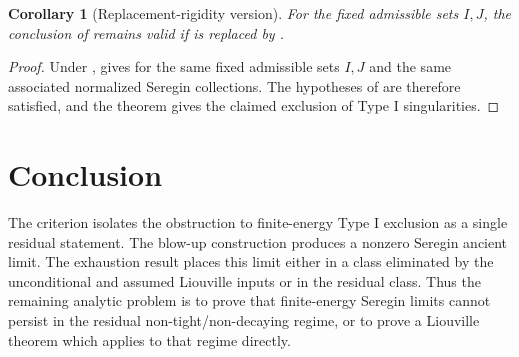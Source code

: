 \documentclass[11pt]{amsart}
\theoremstyle{plain}
\newtheorem{corollary}[theorem]{Corollary}
\theoremstyle{definition}
\theoremstyle{remark}
\numberwithin{equation}{section}
\begin{document}
\begin{corollary}[Replacement-rigidity version]\label{cor:replacement}
For the fixed admissible sets \(I,J\), the conclusion of
 remains valid if  is replaced by
.
\end{corollary}

\begin{proof}
Under ,  gives
 for the same fixed admissible sets \(I,J\) and the same
associated normalized Seregin collections.  The hypotheses of
 are therefore satisfied, and the theorem gives the
claimed exclusion of Type I singularities.
\end{proof}

\section{Conclusion}

The criterion isolates the obstruction to finite-energy Type I exclusion as a
single residual statement.  The blow-up construction produces a nonzero
Seregin ancient limit.  The exhaustion result places this limit either in a
class eliminated by the unconditional and assumed Liouville inputs or in the
residual class.
Thus the remaining analytic problem is to prove that finite-energy Seregin
limits cannot persist in the residual non-tight/non-decaying regime, or to
prove a Liouville theorem which applies to that regime directly.
\end{document}
